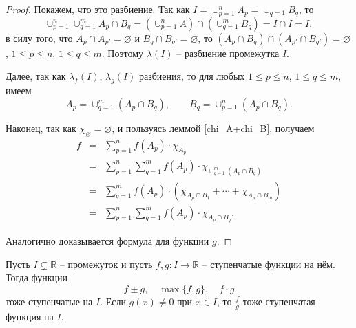 \begin{proof} Покажем, что это разбиение. Так как $I = \cup_{p=1}^n A_p = \cup_{q= 1}B_q$, то
\[
 \cup_{p=1}^n \cup_{q=1}^m A_p \cap B_q  = \left( \cup_{p=1}^n A \right) \cap \left( \cup_{q=1}^m B_q \right) = I \cap I = I,
\]
в силу того, что $A_p \cap A_{p'} = \varnothing$ и $B_q \cap B_{q'} = \varnothing$, то $(A_p \cap B_q) \cap (A_{p'}\cap B_{q'}) = \varnothing$, $1\le p \le n$, $1\le q \le m$. Поэтому $\lambda(I)$ -- разбиение промежутка $I$.


Далее, так как $\lambda_f(I)$, $\lambda_g(I)$ разбиения, то для любых $1\le p \le n$, $1\le q \le m$, имеем
\[
 A_p = \cup_{q=1}^m (A_p \cap B_q), \qquad B_q = \cup_{p=1}^n (A_p \cap B_q).
\]

Наконец, так как $\chi_\varnothing = \varnothing$, и пользуясь леммой \ref{chi_A+chi_B}, получаем
\begin{eqnarray*}
    f &=& \sum_{p=1}^n f(A_p) \cdot \chi_{A_p} \\
    &=& \sum_{p=1}^n\sum_{q=1}^m f(A_p) \cdot \chi_{ \cup_{q=1}^m (A_p \cap B_q)} \\
    &=& \sum_{q=1}^m f(A_p) \cdot \left(\chi_{A_p \cap B_1} + \cdots + \chi_{A_p \cap B_m} \right) \\
    &=& \sum_{p=1}^n\sum_{q=1}^m f(A_p) \cdot \chi_{A_p \cap B_q}.
\end{eqnarray*}

Аналогично доказывается формула для функции $g.$
    
\end{proof}


\begin{corollary}\label{cor_for_sum}
 Пусть $I \subsetneq \mathbb{R}$ -- промежуток и пусть $f,g:I \to \mathbb{R}$ -- ступенчатые функции на нём. Тогда функции
    \[
     f\pm g, \quad \max\{f,g\}, \quad f\cdot g
    \]
    тоже ступенчатые на $I$. Если $g(x) \ne 0$ при $x \in I$, то $\frac{f}{g}$ тоже ступенчатая функция на $I.$    
\end{corollary}
    

